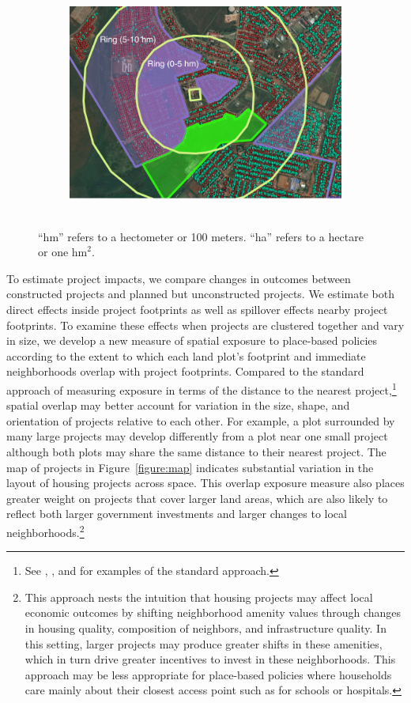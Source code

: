 \documentclass[12pt]{article}
\newcommand{\hmrefha}{
	``hm'' refers to a hectometer or 100 meters. ``ha'' refers to a hectare or one $\text{hm}^{2}$.
}
\begin{document}
\begin{figure}[hbtp]
\begin{subfigure}[b]{.8\textwidth}
        \includegraphics[width=\textwidth,trim={.2cm .2cm .2cm 0cm}, clip=true]{figures/hm_spill_75.png}
        \label{fig:outsideproj}
    \end{subfigure}\\
    {\footnotesize \hmrefha}
\end{figure} 





To estimate project impacts, we compare changes in outcomes between constructed projects and planned but unconstructed projects.  We estimate both direct effects inside project footprints as well as spillover effects nearby project footprints.  To examine these effects when projects are clustered together and vary in size, we develop a new measure of spatial exposure to place-based policies according to the extent to which each land plot's footprint and immediate neighborhoods overlap with project footprints.  Compared to the standard approach of measuring exposure in terms of the distance to the nearest project,\footnote{See \cite{diamond2019wants}, \cite{rossi2010housing}, and \cite{neumark2015place} for examples of the standard approach.} spatial overlap may better account for variation in the size, shape, and orientation of projects relative to each other.  For example, a plot surrounded by many large projects may develop differently from a plot near one small project although both plots may share the same distance to their nearest project.  The map of projects in Figure~\ref{figure:map} indicates substantial variation in the layout of housing projects across space.  This overlap exposure measure also places greater weight on projects that cover larger land areas, which are also likely to reflect both larger government investments and larger changes to local neighborhoods.\footnote{This approach nests the intuition that housing projects may affect local economic outcomes by shifting neighborhood amenity values through changes in housing quality, composition of neighbors, and infrastructure quality.  In this setting, larger projects may produce greater shifts in these amenities, which in turn drive greater incentives to invest in these neighborhoods.  This approach may be less appropriate for place-based policies where households care mainly about their closest access point such as for schools or hospitals.}
\end{document}
